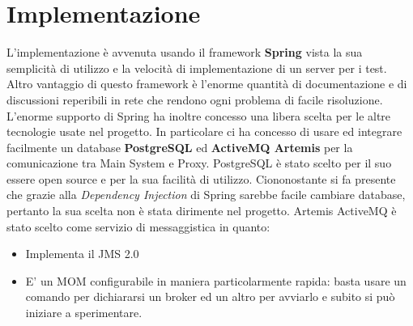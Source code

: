 \chapter{Implementazione}
L’implementazione è avvenuta usando il framework \textbf{Spring} vista la sua semplicità di utilizzo e la velocità di implementazione di un server per i test.
Altro vantaggio di questo framework è l’enorme quantità di documentazione e di discussioni reperibili in rete che rendono ogni problema di facile risoluzione.
\\L’enorme supporto di Spring ha inoltre concesso una libera scelta per le altre tecnologie usate nel progetto. In particolare ci ha concesso di usare ed integrare facilmente un database \textbf{PostgreSQL} ed \textbf{ActiveMQ Artemis} per la comunicazione tra Main System e Proxy.
\vspace{0.5cm}
PostgreSQL è stato scelto per il suo essere open source e per la sua facilità di utilizzo. Ciononostante si fa presente che grazie alla \textit{Dependency Injection} di Spring sarebbe facile cambiare database, pertanto la sua scelta non è stata dirimente nel progetto.
\vspace{0.5cm}
Artemis ActiveMQ è stato scelto come servizio di messaggistica in quanto:
\begin{itemize}
	\item Implementa il JMS 2.0
	\item E’ un MOM configurabile in maniera particolarmente rapida: basta usare un comando per dichiararsi un broker ed un altro per avviarlo e subito si può iniziare a sperimentare.
\end{itemize}

